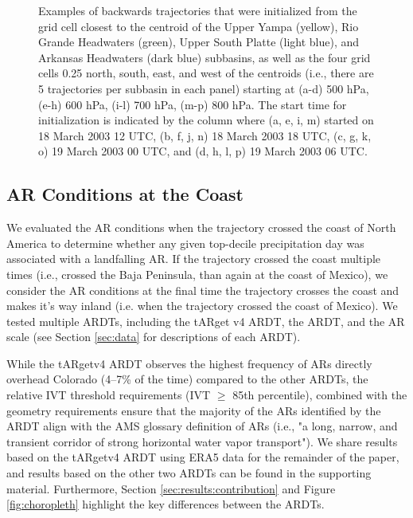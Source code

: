 \documentclass[draft]{agujournal2019}
\begin{document}
\begin{figure}
\caption{Examples of backwards trajectories that were initialized from the grid cell closest to the centroid of the Upper Yampa (yellow), Rio Grande Headwaters (green), Upper South Platte (light blue), and Arkansas Headwaters (dark blue) subbasins, as well as the four grid cells 0.25\textdegree{} north, south, east, and west of the centroids (i.e., there are 5 trajectories per subbasin in each panel) starting at (a-d) 500 hPa, (e-h) 600 hPa, (i-l) 700 hPa, (m-p) 800 hPa. The start time for initialization is indicated by the column where (a, e, i, m) started on 18 March 2003 12 UTC, (b, f, j, n) 18 March 2003 18 UTC, (c, g, k, o) 19 March 2003 00 UTC, and (d, h, l, p) 19 March 2003 06 UTC.}
\label{fig:sensitivity_tests}
\end{figure}

\subsection{AR Conditions at the Coast}
\label{sec:methods:ar_conditions}
We evaluated the AR conditions when the trajectory crossed the coast of North America to determine whether any given top-decile precipitation day was associated with a landfalling AR. If the trajectory crossed the coast multiple times (i.e., crossed the Baja Peninsula, than again at the coast of Mexico), we consider the AR conditions at the final time the trajectory crosses the coast and makes it's way inland (i.e. when the trajectory crossed the coast of Mexico). We tested multiple ARDTs, including the  tARget v4 ARDT, the  ARDT, and the AR scale \cite{MartinRalph2019} (see Section \ref{sec:data} for descriptions of each ARDT).

While the tARgetv4 ARDT observes the highest frequency of ARs directly overhead Colorado (4--7\% of the time) compared to the other ARDTs, the relative IVT threshold requirements (IVT $\geq$ 85th percentile), combined with the geometry requirements ensure that the majority of the ARs identified by the ARDT align with the AMS glossary definition of ARs (i.e., "a long, narrow, and transient corridor of strong horizontal water vapor transport"). We share results based on the tARgetv4 ARDT using ERA5 data for the remainder of the paper, and results based on the other two ARDTs can be found in the supporting material. Furthermore, Section \ref{sec:results:contribution} and Figure \ref{fig:choropleth} highlight the key differences between the ARDTs. 

\end{document}
